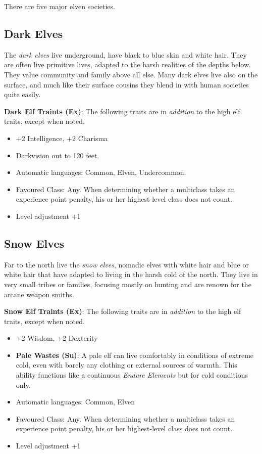 There are five major elven societies.

\subsection*{Dark Elves}

The \emph{dark elves} live underground, have black to blue skin and white
hair. They are often live primitive lives, adapted to the harsh realities of
the depths below. They value community and family above all else. Many dark
elves live also on the surface, and much like their surface cousins they blend
in with human societies quite easily.

\begin{35e}
  \textbf{Dark Elf Traints (Ex)}: The following traits are in \emph{addition}
  to the high elf traits, except when noted.
  \begin{itemize}[noitemsep]
    \item +2 Intelligence, +2 Charisma
    \item Darkvision out to 120 feet.
    \item Automatic languages: Common, Elven, Undercommon.
    \item Favoured Class: Any. When determining whether a multiclass takes an
    experience point penalty, his or her highest-level class does not count.
    \item Level adjustment +1
  \end{itemize}
\end{35e}

\subsection*{Snow Elves}

Far to the north live the \emph{snow elves}, nomadic elves with white hair and
blue or white hair that have adapted to living in the harsh cold of the north.
They live in very small tribes or families, focusing mostly on hunting and are
renown for the arcane weapon smiths.

\begin{35e}
  \textbf{Snow Elf Traints (Ex)}: The following traits are in \emph{addition}
  to the high elf traits, except when noted.
  \begin{itemize}[noitemsep]
    \item +2 Wisdom, +2 Dexterity
    \item \textbf{Pale Wastes (Su)}: A pale elf can live comfortably in
    conditions of extreme cold, even with barely any clothing or external
    sources of warmth. This ability functions like a continuous \emph{Endure
    Elements} but for cold conditions only.
    \item Automatic languages: Common, Elven
    \item Favoured Class: Any. When determining whether a multiclass takes an
    experience point penalty, his or her highest-level class does not count.
    \item Level adjustment +1
  \end{itemize}
\end{35e}

